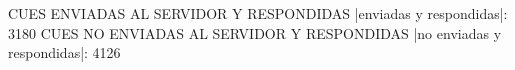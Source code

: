 CUES ENVIADAS AL SERVIDOR Y RESPONDIDAS
|enviadas y respondidas|: 3180
CUES NO ENVIADAS AL SERVIDOR Y RESPONDIDAS
|no enviadas y respondidas|: 4126